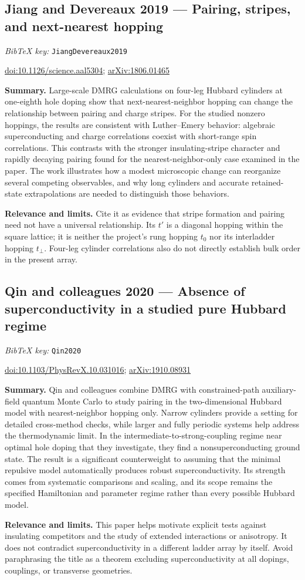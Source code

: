 \documentclass[11pt]{article}
\newcommand{\paper}[2]{\Needspace{8\baselineskip}\subsection{#2}\label{paper:#1}\textit{BibTeX key:} \texttt{#1}\quad\citep{#1}\par}
\newcommand{\doi}[1]{\href{https://doi.org/#1}{doi:#1}}
\newcommand{\arxiv}[1]{\href{https://arxiv.org/abs/#1}{arXiv:#1}}
\newcommand{\summary}{\par\textbf{Summary.} }
\newcommand{\relevance}{\par\textbf{Relevance and limits.} }
\begin{document}
\paper{JiangDevereaux2019}{Jiang and Devereaux 2019 --- Pairing, stripes, and next-nearest hopping}
\doi{10.1126/science.aal5304}; \arxiv{1806.01465}
\summary Large-scale DMRG calculations on four-leg Hubbard cylinders at one-eighth hole doping show that next-nearest-neighbor hopping can change the relationship between pairing and charge stripes. For the studied nonzero hoppings, the results are consistent with Luther--Emery behavior: algebraic superconducting and charge correlations coexist with short-range spin correlations. This contrasts with the stronger insulating-stripe character and rapidly decaying pairing found for the nearest-neighbor-only case examined in the paper. The work illustrates how a modest microscopic change can reorganize several competing observables, and why long cylinders and accurate retained-state extrapolations are needed to distinguish those behaviors.
\relevance Cite it as evidence that stripe formation and pairing need not have a universal relationship. Its $t'$ is a diagonal hopping within the square lattice; it is neither the project's rung hopping $t_0$ nor its interladder hopping $t_\perp$. Four-leg cylinder correlations also do not directly establish bulk order in the present array.

\paper{Qin2020}{Qin and colleagues 2020 --- Absence of superconductivity in a studied pure Hubbard regime}
\doi{10.1103/PhysRevX.10.031016}; \arxiv{1910.08931}
\summary Qin and colleagues combine DMRG with constrained-path auxiliary-field quantum Monte Carlo to study pairing in the two-dimensional Hubbard model with nearest-neighbor hopping only. Narrow cylinders provide a setting for detailed cross-method checks, while larger and fully periodic systems help address the thermodynamic limit. In the intermediate-to-strong-coupling regime near optimal hole doping that they investigate, they find a nonsuperconducting ground state. The result is a significant counterweight to assuming that the minimal repulsive model automatically produces robust superconductivity. Its strength comes from systematic comparisons and scaling, and its scope remains the specified Hamiltonian and parameter regime rather than every possible Hubbard model.
\relevance This paper helps motivate explicit tests against insulating competitors and the study of extended interactions or anisotropy. It does not contradict superconductivity in a different ladder array by itself. Avoid paraphrasing the title as a theorem excluding superconductivity at all dopings, couplings, or transverse geometries.
\end{document}
